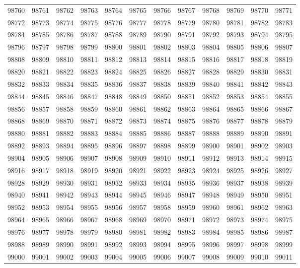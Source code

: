 \begin{center}
\begin{longtable}{llllllllllll}
98760 &98761 &98762 &98763 &98764 &98765 &98766 &98767 &98768 &98769 &98770 &98771 \\
98772 &98773 &98774 &98775 &98776 &98777 &98778 &98779 &98780 &98781 &98782 &98783 \\
98784 &98785 &98786 &98787 &98788 &98789 &98790 &98791 &98792 &98793 &98794 &98795 \\
98796 &98797 &98798 &98799 &98800 &98801 &98802 &98803 &98804 &98805 &98806 &98807 \\
98808 &98809 &98810 &98811 &98812 &98813 &98814 &98815 &98816 &98817 &98818 &98819 \\
98820 &98821 &98822 &98823 &98824 &98825 &98826 &98827 &98828 &98829 &98830 &98831 \\
98832 &98833 &98834 &98835 &98836 &98837 &98838 &98839 &98840 &98841 &98842 &98843 \\
98844 &98845 &98846 &98847 &98848 &98849 &98850 &98851 &98852 &98853 &98854 &98855 \\
98856 &98857 &98858 &98859 &98860 &98861 &98862 &98863 &98864 &98865 &98866 &98867 \\
98868 &98869 &98870 &98871 &98872 &98873 &98874 &98875 &98876 &98877 &98878 &98879 \\
98880 &98881 &98882 &98883 &98884 &98885 &98886 &98887 &98888 &98889 &98890 &98891 \\
98892 &98893 &98894 &98895 &98896 &98897 &98898 &98899 &98900 &98901 &98902 &98903 \\
98904 &98905 &98906 &98907 &98908 &98909 &98910 &98911 &98912 &98913 &98914 &98915 \\
98916 &98917 &98918 &98919 &98920 &98921 &98922 &98923 &98924 &98925 &98926 &98927 \\
98928 &98929 &98930 &98931 &98932 &98933 &98934 &98935 &98936 &98937 &98938 &98939 \\
98940 &98941 &98942 &98943 &98944 &98945 &98946 &98947 &98948 &98949 &98950 &98951 \\
98952 &98953 &98954 &98955 &98956 &98957 &98958 &98959 &98960 &98961 &98962 &98963 \\
98964 &98965 &98966 &98967 &98968 &98969 &98970 &98971 &98972 &98973 &98974 &98975 \\
98976 &98977 &98978 &98979 &98980 &98981 &98982 &98983 &98984 &98985 &98986 &98987 \\
98988 &98989 &98990 &98991 &98992 &98993 &98994 &98995 &98996 &98997 &98998 &98999 \\
99000 &99001 &99002 &99003 &99004 &99005 &99006 &99007 &99008 &99009 &99010 &99011 \\

\end{longtable}
\end{center}
